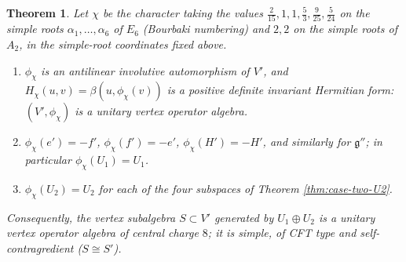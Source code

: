 \documentclass[leqno]{article}
\newtheorem{thm}{Theorem}[section]
\numberwithin{equation}{section}
\begin{document}
\begin{thm}
\label{thm:unitarity}
Let $\chi$ be the character taking the values $\frac{2}{15}, 1, 1, \frac53, \frac{9}{25}, \frac{5}{24}$ on the simple roots $\alpha_1, \ldots, \alpha_6$ of $E_6$ (Bourbaki numbering) and $2, 2$ on the simple roots of $A_2$, in the simple-root coordinates fixed above.
\begin{enumerate}
\item $\phi_\chi$ is an antilinear involutive automorphism of $V'$, and $H_\chi(u,v) = \beta(u,\phi_\chi(v))$ is a positive definite invariant Hermitian form: $(V',\phi_\chi)$ is a unitary vertex operator algebra.
\item $\phi_\chi(e') = -f'$, $\phi_\chi(f') = -e'$, $\phi_\chi(H') = -H'$, and similarly for $\mathfrak g''$; in particular $\phi_\chi(U_1) = U_1$.
\item $\phi_\chi(U_2) = U_2$ for each of the four subspaces of Theorem \ref{thm:case-two-U2}.
\end{enumerate}
Consequently, the vertex subalgebra $S \subset V'$ generated by $U_1 \oplus U_2$ is a unitary vertex operator algebra of central charge $8$; it is simple, of CFT type and self-contragredient ($S \cong S'$).
\end{thm}
\end{document}
